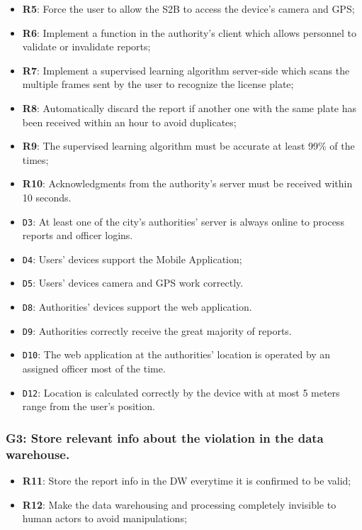 \documentclass[12pt,a4paper]{article}
\begin{document}
	\begin{itemize}
			\item \textbf{R5}: Force the user to allow the S2B to access the device's camera and GPS;
			\item \textbf{R6}: Implement a function in the authority's client which allows personnel to validate or invalidate reports;
			\item \textbf{R7}: Implement a supervised learning algorithm server-side which scans the multiple frames sent by the user to recognize the license plate;
			\item \textbf{R8}: Automatically discard the report if another one with the same plate has been received within an hour to avoid duplicates;
			\item \textbf{R9}: The supervised learning algorithm must be accurate at least 99\% of the times;
			\item \textbf{R10}: Acknowledgments from the authority's server must be received within 10 seconds.
	\end{itemize}
	
	\begin{itemize}
			\item \texttt{D3}: At least one of the city's authorities' server is always online to process reports and officer logins.
			\item \texttt{D4}: Users' devices support the Mobile Application;
			\item \texttt{D5}: Users' devices camera and GPS work correctly.
			\item \texttt{D8}: Authorities' devices support the web application.
			\item \texttt{D9}: Authorities correctly receive the great majority of reports.
			\item \texttt{D10}: The web application at the authorities' location is operated by an assigned officer most of the time.
			\item \texttt{D12}: Location is calculated correctly by the device with at most 5 meters range from the user's position.
	\end{itemize}

\subsubsection{G3: Store relevant info about the violation in the data warehouse.}
	
	\begin{itemize}
			\item \textbf{R11}: Store the report info in the DW everytime it is confirmed to be valid;
			\item \textbf{R12}: Make the data warehousing  and processing completely invisible to human actors to avoid manipulations;
	\end{itemize}
	
\end{document}
